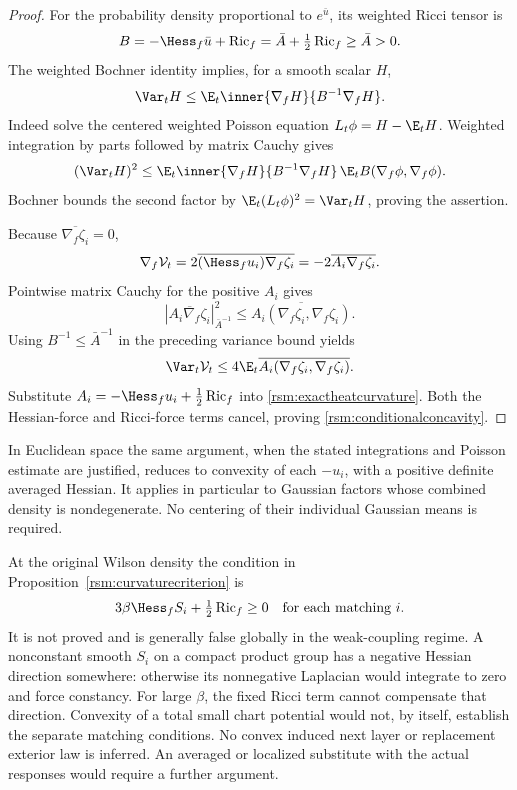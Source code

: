 \begin{proof}
For the probability density proportional to \(e^{\bar u}\), its weighted Ricci tensor is
\[
 B=-\Hess_f\bar u+\operatorname{Ric}_f
   =\bar A+\tfrac12\operatorname{Ric}_f
   \ge\bar A>0.
\]
The weighted Bochner identity implies, for a smooth scalar \(H\),
\[
 \Var_tH\le
 \E_t\inner{\nabla_fH}{B^{-1}\nabla_fH}.
\]
Indeed solve the centered weighted Poisson equation \(L_t\phi=H-\E_tH\).
Weighted integration by parts followed by matrix Cauchy gives
\[
 (\Var_tH)^2
 \le
 \E_t\inner{\nabla_fH}{B^{-1}\nabla_fH}\,
 \E_t B(\nabla_f\phi,\nabla_f\phi).
\]
Bochner bounds the second factor by \(\E_t(L_t\phi)^2=\Var_tH\), proving the assertion.

Because \(\overline{\nabla_f\zeta_i}=0\),
\[
 \nabla_f\mathcal V_t
 =2\overline{(\Hess_fu_i)\nabla_f\zeta_i}
 =-2\overline{A_i\nabla_f\zeta_i}.
\]
Pointwise matrix Cauchy for the positive \(A_i\) gives
\[
 \left|
     \overline{A_i\nabla_f\zeta_i}
 \right|_{\bar A^{-1}}^2
 \le
 \overline{A_i(\nabla_f\zeta_i,\nabla_f\zeta_i)}.
\]
Using \(B^{-1}\le\bar A^{-1}\) in the preceding variance bound yields
\[
 \Var_t\mathcal V_t
 \le4\E_t\overline{
        A_i(\nabla_f\zeta_i,\nabla_f\zeta_i)}.
\]
Substitute \(A_i=-\Hess_fu_i+\frac12\operatorname{Ric}_f\) into
\eqref{rsm:exactheatcurvature}. Both the Hessian-force and Ricci-force terms cancel, proving \eqref{rsm:conditionalconcavity}.
\end{proof}

In Euclidean space the same argument, when the stated integrations and Poisson estimate are justified, reduces to convexity of each \(-u_i\), with a positive definite averaged Hessian. It applies in particular to Gaussian factors whose combined density is nondegenerate. No centering of their individual Gaussian means is required.

At the original Wilson density the condition in Proposition~\ref{rsm:curvaturecriterion} is
\begin{equation}
 3\beta\Hess_fS_i+\tfrac12\operatorname{Ric}_f\ge0
 \quad\hbox{for each matching }i.
 \label{rsm:unprovedfactorcondition}
\end{equation}
It is not proved and is generally false globally in the weak-coupling regime. A nonconstant smooth \(S_i\) on a compact product group has a negative Hessian direction somewhere: otherwise its nonnegative Laplacian would integrate to zero and force constancy. For large \(\beta\), the fixed Ricci term cannot compensate that direction. Convexity of a total small chart potential would not, by itself, establish the separate matching conditions. No convex induced next layer or replacement exterior law is inferred. An averaged or localized substitute with the actual responses would require a further argument.

